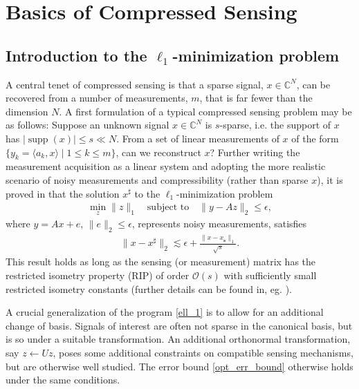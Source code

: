 \documentclass[11pt, oneside]{article}   %
\DeclareMathOperator*{\supp}{supp}
\newcommand{\bC}{\mathbb{C}}
\renewcommand{\O}{\mathcal{O}}
\newcommand{\norm}[1]{\lVert #1 \rVert}
\begin{document}
%
% 
\section{Basics of Compressed Sensing}
\subsection{Introduction to the $\ell_1$-minimization problem}\label{intro to ell1}
A central tenet of compressed sensing is that a sparse signal, $x \in \bC^N$, 
can be recovered from a number of measurements, $m$, that is far fewer 
than the dimension $N$. A first formulation of a typical compressed sensing 
problem may be as follows: Suppose an unknown signal $x \in \bC^N$ is 
$s$-sparse, i.e. \!the support of $x$ has $\lvert \supp(x) \rvert \leq s 
\ll N$. 
From a set of linear measurements of $x$ of the form $\{y_k = 
\langle a_k, x \rangle \mid 1\leq k \leq m\}$, can we reconstruct $x$?
Further writing the measurement acquisition as a linear system and adopting the 
more realistic scenario of noisy measurements and compressibility (rather than 
sparse $x$), it is proved in \cite{candes2006stable} that the solution 
$x^\sharp$ to the $\ell_1$-minimization problem 
\begin{align}
\min_z \lVert z \rVert_1 \quad\text{subject to} \quad \norm{y - Az}_2 \leq 
\epsilon, 
\label{ell_1}
\tag{$\ell_1$ min}
\end{align}
where $y = Ax + e$, $\norm{e}_2 \leq \epsilon$, represents noisy measurements, 
satisfies 
\begin{align}
\norm{x - x^\sharp}_2 \lesssim \epsilon + \frac{\norm{x - 
x_\mathbf{s}}_1}{\sqrt{s}}.
\label{opt_err_bound}
\end{align}
This result holds as long as the sensing (or measurement) matrix has the 
restricted isometry property (RIP) of order $\O(s)$ with sufficiently small 
restricted isometry constants (further details can be found in, eg.
\cite[Chapter 6]{foucart2013mathematical}). 

A crucial generalization of the program \eqref{ell_1} is to allow for an additional change of basis. Signals of interest are often not sparse in the canonical basis, but is so under a suitable transformation. An additional orthonormal transformation, say $z \leftarrow Uz$, poses some additional constraints on compatible sensing mechanisms, but are otherwise well studied. The error bound \eqref{opt_err_bound} otherwise holds under the same conditions.
\end{document}
